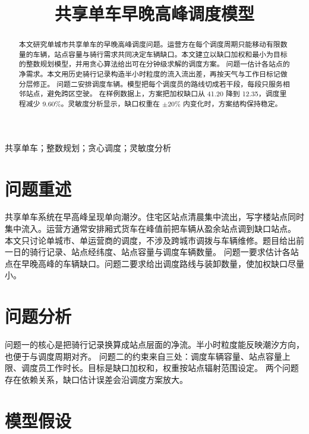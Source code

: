 \documentclass[12pt,a4paper]{article}
\begin{document}
\title{\heiti\fontsize{16}{20}\selectfont 共享单车早晚高峰调度模型}
\author{}
\date{}
\maketitle
\thispagestyle{fancy}

\vspace{0.3cm}

\begin{abstract}
本文研究单城市共享单车的早晚高峰调度问题。运营方在每个调度周期只能移动有限数量的车辆，站点容量与骑行需求共同决定车辆缺口。本文建立以缺口加权和最小为目标的整数规划模型，并用贪心算法给出可在分钟级求解的调度方案。
问题一估计各站点的净需求。本文用历史骑行记录构造半小时粒度的流入流出差，再按天气与工作日标记做分层修正。
问题二安排调度车辆。模型把每个调度员的路线切成若干段，每段只服务相邻站点，避免跨区空驶。
在样例数据上，方案把加权缺口从 41.20 降到 12.35，调度里程减少 9.60\%。灵敏度分析显示，缺口权重在 $\pm 20\%$ 内变化时，方案结构保持稳定。
\end{abstract}

\vspace{0.2cm}

共享单车；整数规划；贪心调度；灵敏度分析

\newpage

\section{问题重述}

共享单车系统在早高峰呈现单向潮汐。住宅区站点清晨集中流出，写字楼站点同时集中流入。运营方通常安排厢式货车在峰值前把车辆从盈余站点调到缺口站点。
本文只讨论单城市、单运营商的调度，不涉及跨城市调拨与车辆维修。题目给出前一日的骑行记录、站点经纬度、站点容量与调度车辆数量。
问题一要求估计各站点在早晚高峰的车辆缺口。问题二要求给出调度路线与装卸数量，使加权缺口尽量小。

\section{问题分析}

问题一的核心是把骑行记录换算成站点层面的净流。半小时粒度能反映潮汐方向，也便于与调度周期对齐。
问题二的约束来自三处：调度车辆容量、站点容量上限、调度员工作时长。目标是缺口加权和，权重按站点辐射范围设定。
两个问题存在依赖关系，缺口估计误差会沿调度方案放大。

\section{模型假设}
\end{document}
